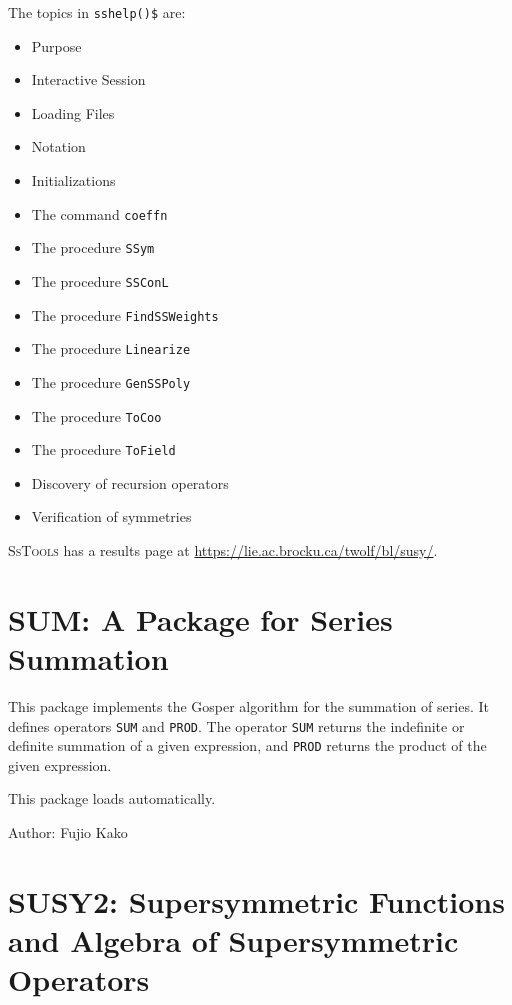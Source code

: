 The topics %
in \texttt{sshelp()\$} are:
\begin{itemize}
\item{Purpose}
\item{Interactive Session}
\item{Loading Files}
\item{Notation}
\item{Initializations}
\item{The command \texttt{coeffn}}
\item{The procedure \texttt{SSym}}
\item{The procedure \texttt{SSConL}}
\item{The procedure \texttt{FindSSWeights}}
\item{The procedure \texttt{Linearize}}
\item{The procedure \texttt{GenSSPoly}}
\item{The procedure \texttt{ToCoo}}
\item{The procedure \texttt{ToField}}
\item{Discovery of recursion operators}
\item{Verification of symmetries}
\end{itemize}

\begin{sloppypar}
  \textsc{SsTools} has a results page at
  \url{https://lie.ac.brocku.ca/twolf/bl/susy/}.
\end{sloppypar}

\newpage

\section{SUM: A Package for Series Summation}

This package implements the Gosper algorithm for the summation of series.
It defines operators {\tt SUM} and {\tt PROD}.  The operator {\tt SUM}
returns the indefinite or definite summation of a given expression, and
{\tt PROD} returns the product of the given expression.

This package loads automatically.

Author: Fujio Kako



\newpage

\section{SUSY2: Supersymmetric Functions and Algebra of Supersymmetric Operators}

